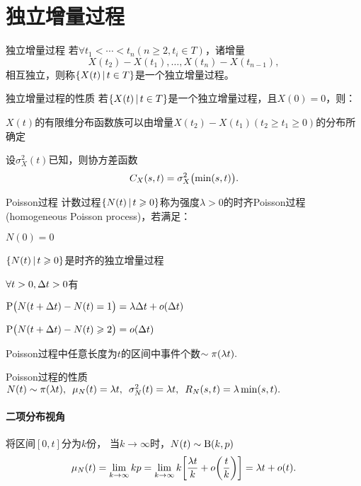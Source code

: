 \section{独立增量过程}
\begin{definition}{独立增量过程}{}
	若$\forall t_1<\cdots<t_n(n\geqslant2, t_i\in T)$，诸增量
	\[
		X(t_2)-X(t_1),\ldots,X(t_n)-X(t_{n-1}),
	\]
	相互独立，则称$\left\{X(t)\,\middle\vert\,t\in T\right\}$是一个独立增量过程。
\end{definition}
\begin{theorem}{独立增量过程的性质}{}
	若$\left\{X(t)\,\middle\vert\,t\in T\right\}$是一个独立增量过程，且$X(0)=0$，则：
	\begin{compactitem}
		\item $X(t)$的有限维分布函数族可以由增量$X(t_2)-X(t_1)(t_2\geqslant t_1\geqslant 0)$的分布所确定
		\item 设$\sigma^2_X(t)$已知，则协方差函数
		\begin{equation}
			C_X(s,t)=\sigma^2_X\bigl(\min(s,t)\bigr).
		\end{equation}
	\end{compactitem}
\end{theorem}
\begin{definition}{Poisson过程}{}
	计数过程$\left\{N(t)\,\middle\vert\,t\geqslant 0\right\}$称为强度$\lambda>0$的时齐Poisson过程(homogeneous Poisson process)，若满足：
	\begin{compactenum}
		\item $N(0)=0$
		\item $\left\{N(t)\,\middle\vert\,t\geqslant 0\right\}$是时齐的独立增量过程
		\item $\forall t>0,\Delta t>0$有
		\begin{compactitem}
			\item $\operatorname{P}\bigl(N(t+\Delta t)-N(t)=1\bigr)=\lambda\Delta t+o(\Delta t)$
			\item $\operatorname{P}\bigl(N(t+\Delta t)-N(t)\geqslant 2\bigr)=o(\Delta t)$
		\end{compactitem}
	\end{compactenum}
\end{definition}
Poisson过程中任意长度为$ t $的区间中事件个数$\sim\operatorname{\pi}(\lambda t).$
\begin{theorem}{Poisson过程的性质}{}
	$N(t)\sim\operatorname{\pi}(\lambda t),\enspace\mu_N(t)=\lambda t,\enspace\sigma^2_N(t)=\lambda t,\enspace R_N(s,t)=\lambda\min(s,t).$%
\end{theorem}
\paragraph{二项分布视角}
将区间$ [0, t] $分为$ k $份，
当$k\to\infty$时，$N(t)\sim\operatorname{B}(k,p)$
\[
	\mu_N(t)=\lim_{k\to\infty}kp=\lim_{k\to\infty}k\biggl[\frac{\lambda t}k+o\biggl(\frac tk\biggr)\biggr]=\lambda t+o(t).
\]
